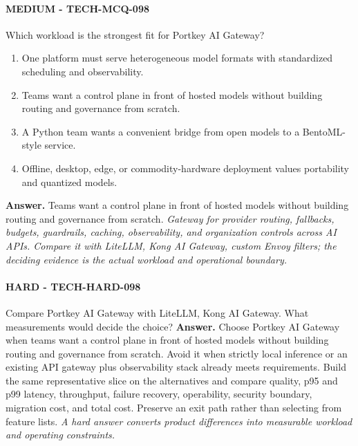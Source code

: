 \paragraph{MEDIUM - TECH-MCQ-098} Which workload is the strongest fit for Portkey AI Gateway?
\begin{enumerate}[label=\Alph*.]
\item One platform must serve heterogeneous model formats with standardized scheduling and observability.
\item Teams want a control plane in front of hosted models without building routing and governance from scratch.
\item A Python team wants a convenient bridge from open models to a BentoML-style service.
\item Offline, desktop, edge, or commodity-hardware deployment values portability and quantized models.
\end{enumerate}
\textbf{Answer.} Teams want a control plane in front of hosted models without building routing and governance from scratch.
\textit{Gateway for provider routing, fallbacks, budgets, guardrails, caching, observability, and organization controls across AI APIs. Compare it with LiteLLM, Kong AI Gateway, custom Envoy filters; the deciding evidence is the actual workload and operational boundary.}
\paragraph{HARD - TECH-HARD-098} Compare Portkey AI Gateway with LiteLLM, Kong AI Gateway. What measurements would decide the choice?
\textbf{Answer.} Choose Portkey AI Gateway when teams want a control plane in front of hosted models without building routing and governance from scratch. Avoid it when strictly local inference or an existing API gateway plus observability stack already meets requirements. Build the same representative slice on the alternatives and compare quality, p95 and p99 latency, throughput, failure recovery, operability, security boundary, migration cost, and total cost. Preserve an exit path rather than selecting from feature lists.
\textit{A hard answer converts product differences into measurable workload and operating constraints.}
